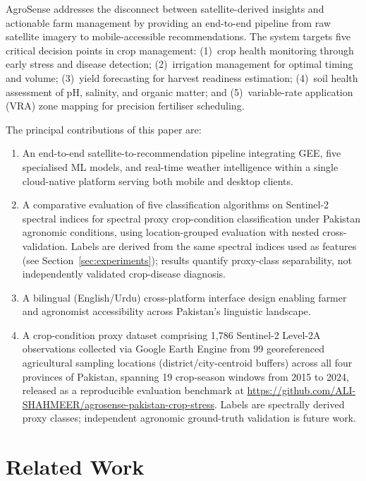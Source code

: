 \documentclass[conference]{IEEEtran}
\begin{document}
AgroSense addresses the disconnect between satellite-derived insights and
actionable farm management by providing an end-to-end pipeline from raw
satellite imagery to mobile-accessible recommendations. The system targets five
critical decision points in crop management: (1)~crop health monitoring through
early stress and disease detection; (2)~irrigation management for optimal timing
and volume; (3)~yield forecasting for harvest readiness estimation; (4)~soil
health assessment of pH, salinity, and organic matter; and (5)~variable-rate
application (VRA) zone mapping for precision fertiliser scheduling.

The principal contributions of this paper are:
\begin{enumerate}
  \item An end-to-end satellite-to-recommendation pipeline integrating GEE,
        five specialised ML models, and real-time weather intelligence within a
        single cloud-native platform serving both mobile and desktop clients.
  \item A comparative evaluation of five classification algorithms on
        Sentinel-2 spectral indices for spectral proxy crop-condition
        classification under Pakistan agronomic conditions, using location-grouped
        evaluation with nested cross-validation. Labels are derived from the same
        spectral indices used as features (see Section~\ref{sec:experiments});
        results quantify proxy-class separability, not independently validated
        crop-disease diagnosis.
  \item A bilingual (English/Urdu) cross-platform interface design enabling
        farmer and agronomist accessibility across Pakistan's linguistic
        landscape.
  \item A crop-condition proxy dataset comprising 1,786 Sentinel-2 Level-2A
        observations collected via Google Earth Engine from 99 georeferenced
        agricultural sampling locations (district/city-centroid buffers) across
        all four provinces of Pakistan, spanning 19 crop-season windows from
        2015 to 2024, released as a reproducible evaluation benchmark at
        \url{https://github.com/ALI-SHAHMEER/agrosense-pakistan-crop-stress}.
        Labels are spectrally derived proxy classes; independent agronomic
        ground-truth validation is future work.
\end{enumerate}

\section{Related Work}
\end{document}
